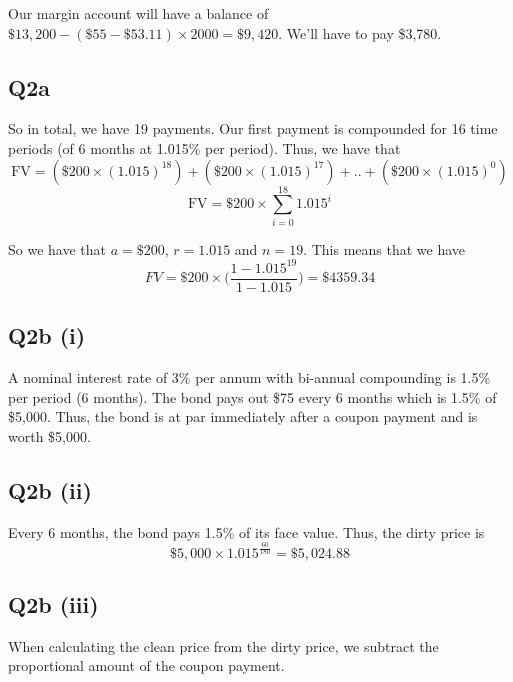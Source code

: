 \documentclass[a4paper]{article}[10pt]
\begin{document}
Our margin account will have a balance of $\$13,200 - (\$55 - \$53.11) \times 2000 = \$9,420$. We'll have to pay \$3,780.

\subsection*{Q2a}
So in total, we have 19 payments. Our first payment is compounded for 16 time periods (of 6 months at 1.015\% per period). Thus, we have that
\begin{equation}
    \text{FV} = (\$200 \times (1.015)^{18}) + (\$200 \times (1.015)^{17}) + .. + (\$200 \times (1.015)^0)
\end{equation}
\begin{equation}
    \text{FV} = \$200 \times \sum^{18}_{i = 0} 1.015^i
\end{equation}

So we have that $a = \$200$, $r = 1.015$ and $n = 19$. This means that we have
\begin{equation}
    FV = \$200 \times \bigg( \frac{1 - 1.015^{19}}{1-1.015} \bigg) = \$4359.34
\end{equation}

\subsection*{Q2b (i)}
A nominal interest rate of 3\% per annum with bi-annual compounding is 1.5\% per period (6 months). The bond pays out \$75 every 6 months which is 1.5\% of \$5,000. Thus, the bond is at par immediately after a coupon payment and is worth \$5,000.

\subsection*{Q2b (ii)}
Every 6 months, the bond pays 1.5\% of its face value. Thus, the dirty price is
\begin{equation}
\$5,000 \times 1.015^{\frac{60}{180}} = \$5,024.88	
\end{equation}

\subsection*{Q2b (iii)}
When calculating the clean price from the dirty price, we subtract the proportional amount of the coupon payment.
\end{document}
